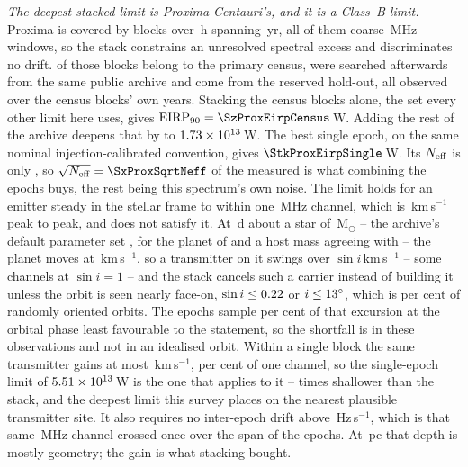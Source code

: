 \emph{The deepest stacked limit is Proxima Centauri's, and it is a Class~B
limit.} Proxima is covered by \StkProxN{} blocks over \StkProxHours\,h
spanning \StkProxSpanYr\,yr, all of them coarse \ChanBModeMHz\,MHz windows,
so the stack constrains an unresolved spectral excess and discriminates no
drift. \SxProxEbCensus{} of those blocks belong to the primary census,
\SzProxEbSearched{} were searched afterwards from the same public archive and
\SzProxEbHold{} come from the reserved hold-out, all observed over the census
blocks' own years. Stacking the census blocks alone, the set every other limit here uses,
gives $\mathrm{EIRP}_{90}=\SzProxEirpCensus$\,W. Adding the rest of the
archive deepens that by \SzProxDeepen{} to $1.73\times10^{13}$\,W. The best
single epoch, on the same nominal injection-calibrated convention, gives
$\StkProxEirpSingle$\,W. Its $N_{\rm eff}$ is only \StkProxNeff, so
$\sqrt{N_{\rm eff}}=\SxProxSqrtNeff$ of the measured \StkProxGain{} is what
combining the epochs buys, the rest being this spectrum's own noise.
The limit holds for an emitter steady in the stellar frame to within one
\ChanBModeMHz\,MHz channel, which is \StkProxTolKms\,km\,s$^{-1}$ peak to
peak, and \PxPlanet{} does not satisfy it. At \PxPorbD\,d about a star of
\PxMassMsun\,M$_\odot$ -- the archive's default parameter set
\citep{NEA2013}, for the planet of \citet{AngladaEscude2016} and a host mass
agreeing with \citet{Kervella2017} -- the planet moves at
\PxVorbKms\,km\,s$^{-1}$, so a
transmitter on it swings over \PxPPKms$\sin i$\,km\,s$^{-1}$ -- some
\PxNChanWalk{} channels at $\sin i=1$ -- and the stack cancels such a
carrier instead of building it unless the orbit is seen nearly face-on,
$\sin i\le0.22$ or $i\le13^\circ$, which is \PxIsoPct{} per
cent of randomly oriented orbits. The \PxNEpoch{} epochs sample
\PxFracSampled{} per cent of that excursion at the orbital phase least
favourable to the statement, so the shortfall is in these observations and
not in an idealised orbit. Within a single block the same transmitter gains
at most \PxBlockDvKms\,km\,s$^{-1}$, \PxBlockPct{} per cent of one channel,
so the single-epoch limit of $5.51 \times 10^{13}$\,W is the one that applies to
it -- \PxEirpRatio{} times shallower than the stack, and the deepest limit
this survey places on the nearest plausible transmitter site. It also
requires no inter-epoch drift above
\StkProxDriftHzS\,Hz\,s$^{-1}$, which is that same \ChanBModeMHz\,MHz channel
crossed once over the span of the epochs. At \StkProxDistPc\,pc that depth is mostly
geometry; the gain is what stacking bought.

